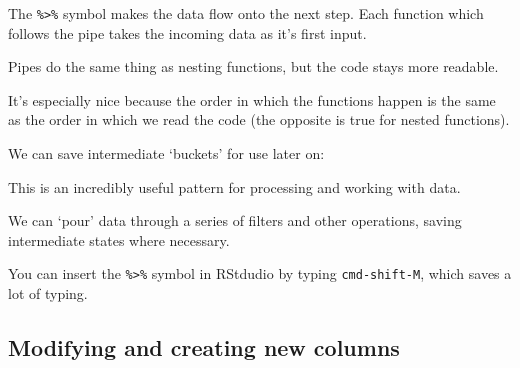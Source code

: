 \documentclass[]{article}
\newenvironment{Shaded}{\begin{snugshade}}{\end{snugshade}}
\newcommand{\DecValTok}[1]{\textcolor[rgb]{0.00,0.00,0.81}{#1}}
\newcommand{\FloatTok}[1]{\textcolor[rgb]{0.00,0.00,0.81}{#1}}
\newcommand{\KeywordTok}[1]{\textcolor[rgb]{0.13,0.29,0.53}{\textbf{#1}}}
\newcommand{\NormalTok}[1]{#1}
\newcommand{\OperatorTok}[1]{\textcolor[rgb]{0.81,0.36,0.00}{\textbf{#1}}}
\newcommand{\StringTok}[1]{\textcolor[rgb]{0.31,0.60,0.02}{#1}}
\begin{document}
\begin{Shaded}
\end{Shaded}

The \texttt{\%\textgreater{}\%} symbol makes the data flow onto the next step. Each function which
follows the pipe takes the incoming data as it's first input.

Pipes do the same thing as nesting functions, but the code stays more readable.

It's especially nice because the order in which the functions happen is the same
as the order in which we read the code (the opposite is true for nested
functions).

We can save intermediate `buckets' for use later on:

\begin{Shaded}
\end{Shaded}

This is an incredibly useful pattern for processing and working with data.

We can `pour' data through a series of filters and other operations, saving
intermediate states where necessary.

You can insert the \texttt{\%\textgreater{}\%} symbol in RStdudio by typing \texttt{cmd-shift-M}, which saves
a lot of typing.

\hypertarget{mutate}{%
\subsection*{Modifying and creating new columns}\label{mutate}}
\end{document}
